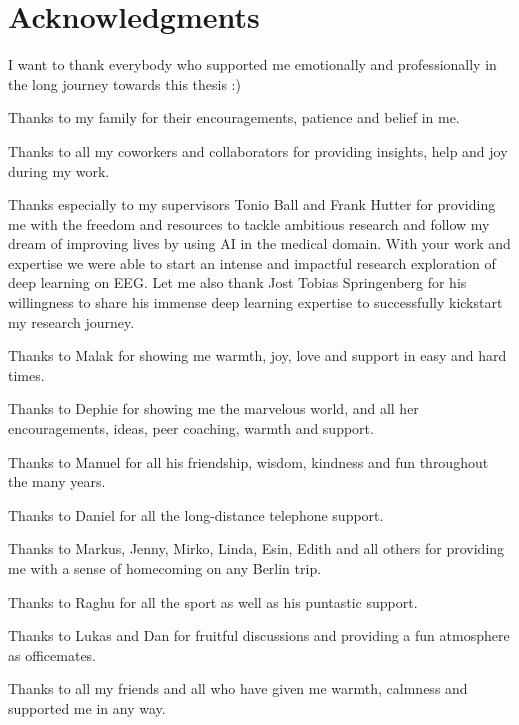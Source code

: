 
\bigskip

\begingroup
\let\clearpage\relax
\let\cleardoublepage\relax
\let\cleardoublepage\relax
\chapter*{Acknowledgments}

I want to thank everybody who supported me emotionally and professionally in the long journey towards this thesis :)

\bigskip
\noindent
Thanks to my family for their encouragements, patience and belief in me.

\bigskip
\noindent
Thanks to all my coworkers and collaborators for providing insights, help and joy during my work.

\bigskip
\noindent
Thanks especially to my supervisors Tonio Ball and Frank Hutter for providing me with the freedom and resources to tackle ambitious research and follow my dream of improving lives by using AI in the medical domain. With your work and expertise we were able to start an intense and impactful research exploration of deep learning on EEG. Let me also thank Jost Tobias Springenberg for his willingness to share his immense deep learning expertise to successfully kickstart my research journey.

\bigskip
\noindent
Thanks to Malak for showing me warmth, joy, love and support in easy and hard times.

\bigskip
\noindent
Thanks to Dephie for showing me the marvelous world, and all her encouragements, ideas, peer coaching, warmth and support.

\bigskip
\noindent
Thanks to Manuel for all his friendship, wisdom, kindness and fun throughout the many years.

\bigskip
\noindent
Thanks to Daniel for all the long-distance telephone support.

\bigskip
\noindent
Thanks to Markus, Jenny, Mirko, Linda, Esin, Edith and all others for providing me with a sense of homecoming on any Berlin trip.

\bigskip
\noindent
Thanks to Raghu for all the sport as well as his puntastic support.

\bigskip
\noindent
Thanks to Lukas and Dan for fruitful discussions and providing a fun atmosphere as officemates.


\bigskip
\noindent
Thanks to all my friends and all who have given me warmth, calmness and supported me in any way.



\bigskip

\endgroup
